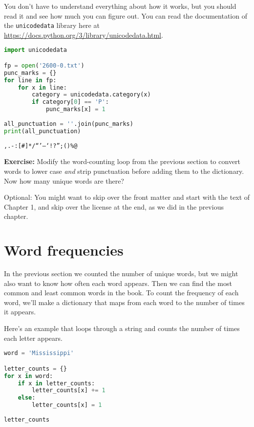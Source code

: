 You don't have to understand everything about how it works, but you
should read it and see how much you can figure out. You can read the
documentation of the \passthrough{\lstinline!unicodedata!} library here
at \url{https://docs.python.org/3/library/unicodedata.html}.

\begin{lstlisting}[language=Python]
import unicodedata

fp = open('2600-0.txt')
punc_marks = {}
for line in fp:
    for x in line:
        category = unicodedata.category(x)
        if category[0] == 'P':
            punc_marks[x] = 1
        
all_punctuation = ''.join(punc_marks)
print(all_punctuation)
\end{lstlisting}

\begin{lstlisting}[]
,.-:[#]*/“’—‘!?”;()%@
\end{lstlisting}

\textbf{Exercise:} Modify the word-counting loop from the previous
section to convert words to lower case \emph{and} strip punctuation
before adding them to the dictionary. Now how many unique words are
there?

Optional: You might want to skip over the front matter and start with
the text of Chapter 1, and skip over the license at the end, as we did
in the previous chapter.

\hypertarget{word-frequencies}{%
\section{Word frequencies}\label{word-frequencies}}

In the previous section we counted the number of unique words, but we
might also want to know how often each word appears. Then we can find
the most common and least common words in the book. To count the
frequency of each word, we'll make a dictionary that maps from each word
to the number of times it appears.

Here's an example that loops through a string and counts the number of
times each letter appears.

\begin{lstlisting}[language=Python]
word = 'Mississippi'

letter_counts = {}
for x in word:
    if x in letter_counts:
        letter_counts[x] += 1
    else:
        letter_counts[x] = 1
        
letter_counts
\end{lstlisting}

